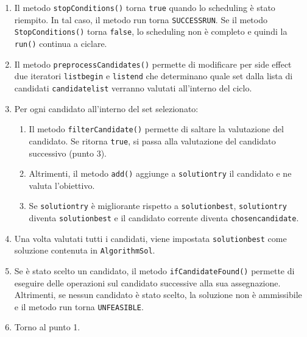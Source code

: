 \begin{enumerate}
    \item Il metodo \texttt{stopConditions()} torna \texttt{true} quando lo scheduling è stato riempito. In tal caso, il metodo run torna \texttt{SUCCESS\textunderscore RUN}. Se il metodo \texttt{StopConditions()} torna \texttt{false}, lo scheduling non è completo e quindi la \texttt{run()} continua a ciclare.
    \item Il metodo \texttt{preprocessCandidates()} permette di modificare per side effect due iteratori \texttt{list\textunderscore begin} e \texttt{list\textunderscore end} che determinano quale set dalla lista di candidati \texttt{candidate\textunderscore list} verranno valutati all'interno del ciclo.
    \item Per ogni candidato all'interno del set selezionato:
    \begin{enumerate}
        \item Il metodo \texttt{filterCandidate()} permette di saltare la valutazione del candidato. Se ritorna \texttt{true}, si passa alla valutazione del candidato successivo (punto 3).
        \item Altrimenti, il metodo \texttt{add()} aggiunge a \texttt{solution\textunderscore try} il candidato e ne valuta l'obiettivo.
        \item Se \texttt{solution\textunderscore try} è migliorante rispetto a  \texttt{solution\textunderscore best}, \texttt{solution\textunderscore try} diventa \texttt{solution\textunderscore best} e il candidato corrente diventa \texttt{chosen\textunderscore candidate}.
    \end{enumerate}
\item Una volta valutati tutti i candidati, viene impostata \texttt{solution\textunderscore best} come soluzione contenuta in \texttt{AlgorithmSol}.
\item Se è stato scelto un candidato, il metodo \texttt{ifCandidateFound()} permette di eseguire delle operazioni sul candidato successive alla sua assegnazione. Altrimenti, se nessun candidato è stato scelto, la soluzione non è ammissibile e il metodo run torna \texttt{UNFEASIBLE}. 
\item Torno al punto 1.
\end{enumerate}
\newpage

